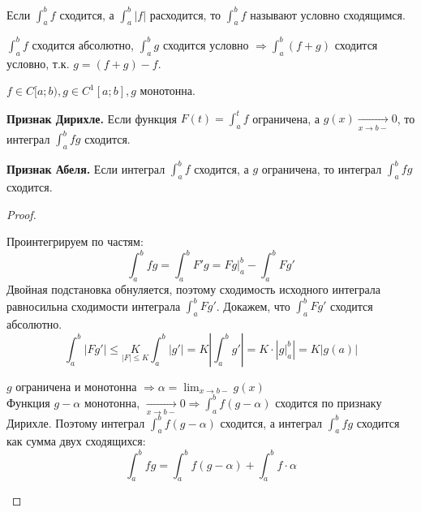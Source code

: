 \begin{Def} 
	Если $\displaystyle \int_{a}^{b} f$ сходится, а $\displaystyle \int_{a}^{b} |f|$ расходится, то 
	$\displaystyle \int_{a}^{b} f$ называют условно сходящимся.
\end{Def} 

\begin{Rem}
	$\displaystyle \int_{a}^{b} f$ сходится абсолютно, $\displaystyle \int_{a}^{b} g$ сходится условно $\displaystyle \Rightarrow \int_{a}^{b} 
	(f+g)$ сходится условно, т.к. $g = (f+g)-f$.
\end{Rem}

\begin{Thm}
	$f \in C[a;b), g \in C^1[a;b], g$ монотонна.

	\begin{MyList}
		\item \textbf{Признак Дирихле.}
		Если функция $F(t) = \int_a^t f$ ограничена, а $g(x) \xrightarrow[x \to b-]{} 0$, то интеграл $\int_a^b fg$ сходится.

		\item \textbf{Признак Абеля.}
		Если интеграл $\int_a^b f$ сходится, а $g$ ограничена, то интеграл $\int_a^b fg$ сходится.
	\end{MyList}
\end{Thm} 

\begin{proof}
	\begin{MyList}
	\item Проинтегрируем по частям:
	$$\displaystyle \int_{a}^{b} fg = \int_{a}^{b} F'g = Fg \Big|_a^b - \int_{a}^{b} Fg'$$
	Двойная подстановка обнуляется, поэтому сходимость исходного интеграла равносильна сходимости интеграла $\int_a^b Fg'$. Докажем, что $\int_{a}^{b} Fg'$ сходится абсолютно. 
	\[ \int_{a}^{b} |Fg'| \leqslant \underset{|F| \leqslant K}{K}  \int_{a}^{b} |g'| = K \left|\int_{a}^{b} g'\right| = 
	K \cdot |g \Big|^b_a| = K|g(a)|\]

	\item $g$ ограничена и монотонна $\Rightarrow \alpha = \lim_{x \to b-} g(x)$\\
	Функция $g - \alpha$ монотонна, $\xrightarrow[x \to b-]{} 0 \Rightarrow 
	\int_{a}^{b} f(g - \alpha)$ сходится по признаку Дирихле. Поэтому интеграл $\int_a^b f(g - \alpha)$ сходится, а интеграл $\int_a^b fg$ сходится как сумма двух сходящихся: 
	$$\displaystyle \int_{a}^{b} fg = \int_{a}^{b} f(g-\alpha) + \int_{a}^{b} f \cdot \alpha$$
	\end{MyList}
\end{proof}

